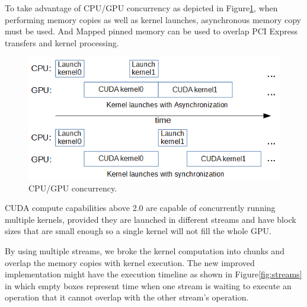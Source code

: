 To take advantage of CPU/GPU concurrency as depicted in Figure\ref{fig:cpu_gpu}, when performing memory copies as well as kernel launches, asynchronous memory copy must be used. And Mapped pinned memory can be used to overlap PCI Express transfers and kernel processing.

\begin{figure}[!htb]
	\centering
	\includegraphics[totalheight=0.3\textwidth]{Figures/cpu_gpu.png}
	\caption{\selectfont CPU/GPU concurrency.}
	\label{fig:cpu_gpu}
\end{figure}

CUDA compute capabilities above 2.0 are capable of concurrently running multiple kernels, provided they are launched in different streams and have block sizes that are small enough so a single kernel will not fill the whole GPU.

By using multiple streams, we broke the kernel computation into chunks and overlap the memory copies with kernel execution. The new improved implementation might have the execution timeline as shown in Figure\ref{fig:streams} in which empty boxes represent time when one stream is waiting to execute an operation that it cannot overlap with the other stream's operation.

